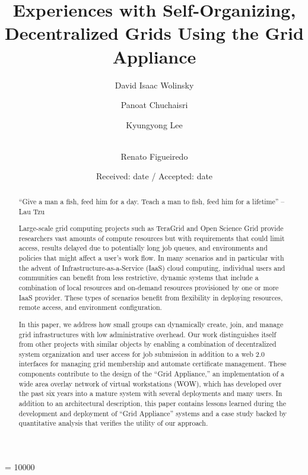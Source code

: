 \documentclass[twocolumn]{svjour3}
\begin{document}
\widowpenalty = 10000

\title{Experiences with Self-Organizing, Decentralized Grids Using the Grid
Appliance}

\author{
David Isaac Wolinsky \and
Panoat Chuchaisri \and
Kyungyong Lee \and \\
Renato Figueiredo
}


\date{Received: date / Accepted: date}

\maketitle


\begin{abstract}

``Give a man a fish, feed him for a day.  Teach a man to fish, feed him for a
lifetime'' -- Lau Tzu

Large-scale grid computing projects such as TeraGrid and Open Science Grid
provide researchers vast amounts of compute resources but with requirements
that could limit access, results delayed due to potentially long job queues,
and environments and policies that might affect a user's work flow. In many
scenarios and in particular with the advent of Infrastructure-as-a-Service
(IaaS) cloud computing, individual users and communities can benefit from less
restrictive, dynamic systems that include a combination of local resources and
on-demand resources provisioned by one or more IaaS provider.  These types of
scenarios benefit from flexibility in deploying resources, remote access, and
environment configuration.

In this paper, we address how small groups can dynamically create, join, and
manage grid infrastructures with low administrative overhead.  Our work
distinguishes itself from other projects with similar objects by enabling a
combination of decentralized system organization and user access for job
submission in addition to a web 2.0 interfaces for managing grid membership and
automate certificate management.  These components contribute to the design of
the ``Grid Appliance,'' an implementation of a wide area overlay network of
virtual workstations (WOW), which has developed over the past six years into a
mature system with several deployments and many users.  In addition to an
architectural description, this paper contains lessons learned during the
development and deployment of ``Grid Appliance'' systems and a case study
backed by quantitative analysis that verifies the utility of our approach.  


\end{abstract}
\end{document}

